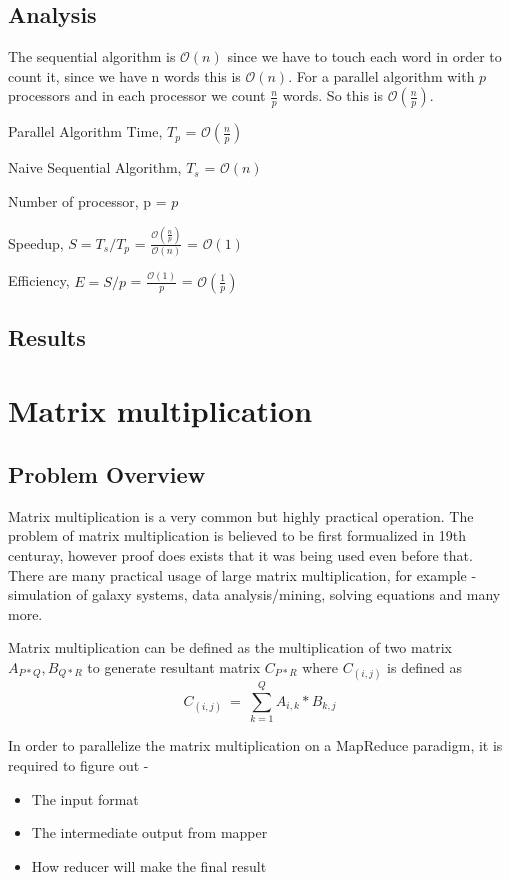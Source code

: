 \documentclass{article}
\begin{document}
\subsection{Analysis}
\BlankLine The sequential algorithm is $\mathcal{O}(n)$ since we have to touch each word in order to count it, since we have n words this is $\mathcal{O}(n)$. For a parallel algorithm with $p$ processors and in each processor we count $\frac{n}{p}$ words. So this is $\mathcal{O}(\frac{n}{p})$.


Parallel Algorithm Time, ${T_{p}}$ = $\mathcal{O}(\frac{n}{p})$

Naive Sequential Algorithm, ${T_{s}}$ = $\mathcal{O}(n)$

Number of processor, p = $p$

Speedup, ${S = T_{s}/T_{p}}$ = $\frac{\mathcal{O}(\frac{n}{p})}{\mathcal{O}(n)}$ = $\mathcal{O}(1)$

Efficiency, ${E = S/p}$ = $\frac{\mathcal{O}(1)}{p}$ = $\mathcal{O}(\frac{1}{p})$

\subsection{Results}

\section{Matrix multiplication}

\subsection{Problem Overview}
Matrix multiplication is a very common but highly practical operation. The problem of matrix multiplication is believed to be first formualized in 19th centuray, however proof does exists that it was being used even before that. There are many practical usage of large matrix multiplication, for example - simulation of galaxy systems, data analysis/mining, solving equations and many more.

Matrix multiplication can be defined as the multiplication of two matrix ${A_{P*Q},B_{Q*R}}$ to generate resultant matrix ${C_{P*R}}$ where ${C_{(i,j)}}$ is defined as
\begin{equation}
C_{(i,j)}\ =\ \sum_{k = 1}^{Q} A_{i, k} *  B_{k,j}
\end{equation}

In order to parallelize the matrix multiplication on a MapReduce paradigm, it is required to figure out -
\begin{itemize}
\item The input format
\item The intermediate output from mapper
\item How reducer will make the final result
\end{itemize}
\end{document}
